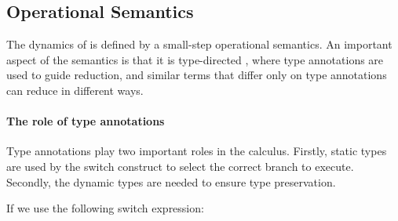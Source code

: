 \begin{comment}
\begin{figure}[t]
  \begin{small}
    \centering
    \drules[typ]{$ [[G |- e dirflag A]] $}{Bi-directional Typing}{int, var, ann, app, sub, abs, typeof}
  \end{small}
  \caption{Typing for \cal.}
  \label{fig:union:typ}
\end{figure}
\end{comment}

\subsection{Operational Semantics}
\label{sec:union:os}
The dynamics of \cal is defined by a small-step operational semantics. An
important aspect of the semantics is that it is type-directed
\cite{Huang:typedirected}, where type annotations are used to guide reduction,
and similar terms that differ only on type annotations can reduce in different
ways.

\paragraph{The role of type annotations}
Type annotations play two important roles in the calculus.
Firstly, static types are used by the switch construct
to select the correct branch to execute. Secondly, the
dynamic types are needed to ensure type preservation.
\begin{comment}
Before going
into the details of operational semantics, it is important to recall
the definition of pre-values, annotated values and values.
An integer expression $[[i]]$ is not a value unless annotated.
Non-annotated lambda expressions ($[[\x.e]]$) are values but cannot appear at left
side in function applications.
Only annotated values $[[w]]$ can appear at left side in function applications.
Annotated values consist of annotated pre-values. That is, it consists of
$[[i:A]]$ and $[[\x.e:(A1->B1):(A2->B2)]]$. This is
because that the orginal static type is tracked by the operational semantics.
Therefore, we can end up in a value such as $[[1 : Int]]$ or $[[1 : Top]]$,
and those two values can behave differently in some contexts.
\bruno{Give an example here}
For functions the static type is not enough and we also need the dynamic type
(which is the original type of the lambda).
For example, if we have:
$e = [[\x.x:Int->Int:(Int->Int)\/(Bool->Bool)]]$, then the static type of $e$ is
$[[(Int->Int)\/(Bool->Bool)]]$ and the, more precise, dynamic type is
$[[Int->Int]]$.
\end{comment}
If we use the following switch expression:

